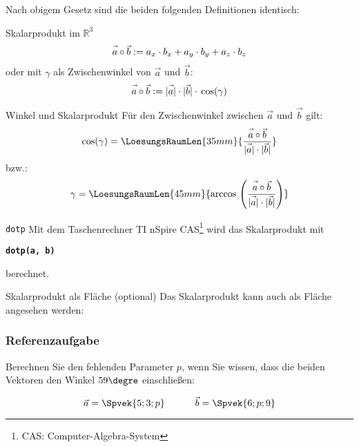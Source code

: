 Nach obigem Gesetz sind die beiden folgenden Definitionen identisch:
\begin{definition}{Skalarprodukt im $\mathbb{R}^3$}{}
  $$\vec{a\vphantom{b}}\circ\vec{b} := a_x\cdot{}b_x + a_y \cdot{} b_y + a_z\cdot{}b_z$$
oder mit $\gamma$ als Zwischenwinkel von $\vec{a}$ und $\vec{b}$:
  $$\vec{a\vphantom{b}}\circ\vec{b} := |\vec{\vphantom{b}a}| \cdot{} |\vec{b}| \cdot{}\cos({\gamma})$$
\end{definition}



\begin{gesetz}{Winkel und Skalarprodukt}{}
Für den Zwischenwinkel zwischen $\vec{a}$ und $\vec{b}$ gilt:
  $$\cos(\gamma) = \LoesungsRaumLen{35mm}{\frac{\vec{a\vphantom{b}}\circ\vec{b}}{|\vec{\vphantom{b}a}|\cdot |\vec{\vphantom{b}b}|}}$$
  bzw.:
  $$\gamma = \LoesungsRaumLen{45mm}{\arccos{} \left(\frac{\vec{a\vphantom{b}}\circ\vec{b}}{|\vec{\vphantom{b}a}|\cdot |\vec{\vphantom{b}b}|}\right)}$$
  
\end{gesetz}
\newpage
\begin{bemerkung}{\texttt{dotp}}{}
Mit dem Taschenrechner TI nSpire CAS\footnote{CAS: Computer-Algebra-System} wird das Skalarprodukt mit

\begin{center}\textbf\texttt{dotp(a, b)}\end{center}

berechnet.

\end{bemerkung}


\begin{bemerkung}{Skalarprodukt als Fläche (optional)}{}
  Das Skalarprodukt kann auch als Fläche angesehen werden:
  
\end{bemerkung}
\newpage


\subsubsection{Referenzaufgabe}
Berechnen Sie den fehlenden Parameter $p$, wenn Sie wissen, dass die
beiden Vektoren den Winkel $59\degre$ einschließen:

$$\vec{a} = \Spvek{5;3;p} \hspace{11mm} \vec{b} = \Spvek{6;p;9}$$

